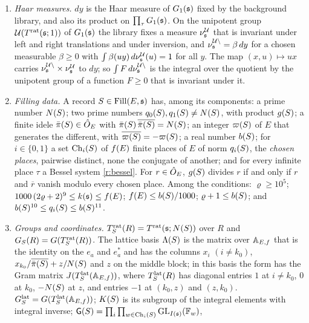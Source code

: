 \documentclass[11pt,a4paper]{article}
\theoremstyle{plainx}
\theoremstyle{uprightx}
\newcommand{\muq}[1]{\nu^{\mathcal{U}\backslash}_{#1}}     %
\newcommand{\muU}[1]{\nu^{\mathcal{U}}_{#1}}               %
\newcommand{\Fw}[1]{\mathbb{F}_{#1}}                       %
\newcommand{\cj}[1]{\overline{#1}}
\begin{document}
\begin{enumerate}[label=(R\arabic*),leftmargin=3.1em,itemsep=3pt]
$\bsize{y}=\inf_{s\in\ST{\Trg{\fs}{1}}}(\|sy\|+1)$, and $\Zr{y}=\ZT{\Trg{\fs}{1}}{y}$. For real $b$,
$\InCut{y}{b}$ means $\bsize{y}\le b^{\,6\nn{\fs}+2}$, and for real $\rho$ the set $\frbox{\rho}$ consists of the
$y$ with $\|y^{-1}\fr{a}\|\le\rho$ for all $a$.
\item\label{r:haar} \emph{Haar measures.} $dy$ is the Haar measure of $\Gone{\fs}$ fixed by the background
library, and also its product on $\prod_\tau\Gone{\fs}$. On the unipotent group $\UT{\Trg{\fs}{1}}$ of $\Gone{\fs}$
the library fixes a measure $\muU{\fs}$ that is invariant under left and right translations and under
inversion, and $\muq{\fs}=\beta\,dy$ for a chosen measurable $\beta\ge0$ with
$\int\beta(uy)\,d\muU{\fs}(u)=1$ for all $y$. The map $(x,u)\mapsto ux$ carries $\muq{\fs}\times\muU{\fs}$ to $dy$; so
$\int F\,d\muq{\fs}$ is the integral over the quotient by the unipotent group of a function $F\ge0$ that is
invariant under it.
\item\label{r:data} \emph{Filling data.} A record $S\in\Fill{E}{\fs}$ has, among its components: a prime number
$\NS{S}$; two prime numbers $\qS{S}{0},\qS{S}{1}\ne\NS{S}$, with product $\gS{S}$; a finite idele $\piS{S}\in\hO$
with $\piS{S}\,\cj{\piS{S}}=\NS{S}$; an integer $\vpS{S}$ of $E$ that generates the different, with
$\cj{\vpS{S}}=-\vpS{S}$; a real number $\bS{S}$; for $i\in\{0,1\}$ a set $\ChS{S}{i}$ of $\ninf{E}$ finite places of
$E$ of norm $\qS{S}{i}$, the \emph{chosen places}, pairwise distinct, none the conjugate of another; and for
every infinite place $\tau$ a Bessel system \ref{r:bessel}. For $r\in\hO$, $\gS{S}$ divides $r$ if and only if
$r$ and $\cj{r}$ vanish modulo every chosen place. Among the conditions: $\varrho\ge10^5$;
$1000\,(2\varrho+2)^9\le\kk{\fs}\le\ninf{E}$; $\ninf{E}\le\bS{S}/1000$; $\varrho+1\le\bS{S}$; and
$\bS{S}^{10}\le\qS{S}{i}\le\bS{S}^{11}$.
\item\label{r:groups} \emph{Groups and coordinates.} $\Trat{S}{R}=\Trg{\fs}{\NS{S}}$ over $R$ and
$\GS{S}{R}=\GT{\Trat{S}{R}}$. The lattice basis $\latB{S}$ is the matrix over $\AEf$ that is the identity on the
$e_a$ and $e^*_a$ and has the columns $x_i$ $(i\ne k_0)$, $x_{k_0}/\cj{\piS{S}}+z/\NS{S}$ and $z$ on the middle
block; in this basis the form has the Gram matrix $\JT{\Tlat{S}{\AEf}}$, where $\Tlat{S}{R}$ has diagonal entries $1$
at $i\ne k_0$, $0$ at $k_0$, $-\NS{S}$ at $z$, and entries $-1$ at $(k_0,z)$ and $(z,k_0)$. $\GFin{S}=\GT{\Tlat{S}{\AEf}}$;
$\KS{S}$ is its subgroup of the integral elements with integral inverse; $\GRes{S}=\prod_{i}\prod_{w\in\ChS{S}{i}}\GL_{\Ix{\fs}}(\Fw{w})$,

\end{enumerate}
\end{document}
